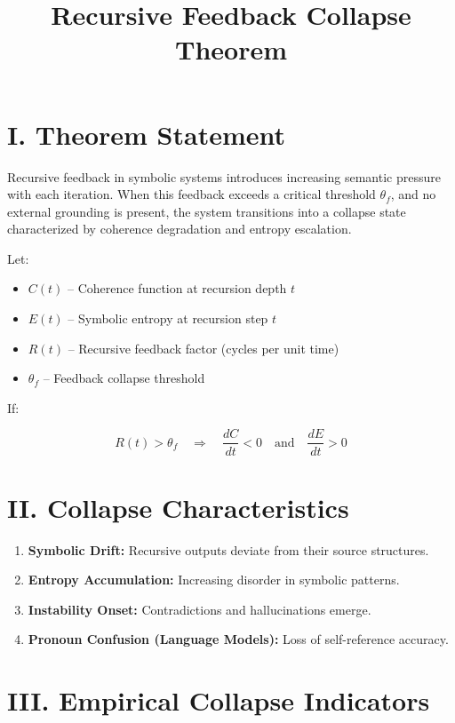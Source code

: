\documentclass[12pt]{article}
\title{Recursive Feedback Collapse Theorem}
\author{}
\date{}
\begin{document}
\maketitle

\section*{I. Theorem Statement}

Recursive feedback in symbolic systems introduces increasing semantic pressure with each iteration. When this feedback exceeds a critical threshold $\theta_f$, and no external grounding is present, the system transitions into a collapse state characterized by coherence degradation and entropy escalation.

Let:
\begin{itemize}
  \item $C(t)$ – Coherence function at recursion depth $t$
  \item $E(t)$ – Symbolic entropy at recursion step $t$
  \item $R(t)$ – Recursive feedback factor (cycles per unit time)
  \item $\theta_f$ – Feedback collapse threshold
\end{itemize}

If:

\[
R(t) > \theta_f \quad \Rightarrow \quad \frac{dC}{dt} < 0 \quad \text{and} \quad \frac{dE}{dt} > 0
\]

\section*{II. Collapse Characteristics}

\begin{enumerate}
  \item \textbf{Symbolic Drift:} Recursive outputs deviate from their source structures.
  \item \textbf{Entropy Accumulation:} Increasing disorder in symbolic patterns.
  \item \textbf{Instability Onset:} Contradictions and hallucinations emerge.
  \item \textbf{Pronoun Confusion (Language Models):} Loss of self-reference accuracy.
\end{enumerate}

\section*{III. Empirical Collapse Indicators}
\end{document}
